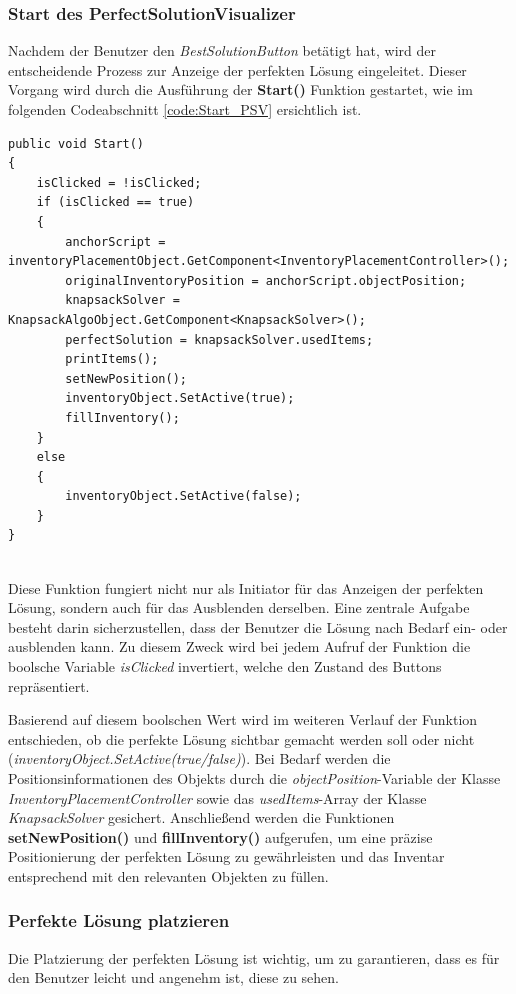 \subsubsection{Start des PerfectSolutionVisualizer}
Nachdem der Benutzer den \textit{BestSolutionButton} betätigt hat, wird der entscheidende Prozess zur Anzeige der perfekten
Lösung eingeleitet. Dieser Vorgang wird durch die Ausführung der \textbf{Start()} Funktion gestartet, wie im folgenden
Codeabschnitt \ref{code:Start_PSV} ersichtlich ist.
\begin{lstlisting}[style=csharp, caption={PerfectSolutionVisualizer Start}, label=code:Start_PSV]
public void Start()
{
    isClicked = !isClicked;
    if (isClicked == true)
    {
        anchorScript = inventoryPlacementObject.GetComponent<InventoryPlacementController>();
        originalInventoryPosition = anchorScript.objectPosition;
        knapsackSolver = KnapsackAlgoObject.GetComponent<KnapsackSolver>();
        perfectSolution = knapsackSolver.usedItems;
        printItems();
        setNewPosition();
        inventoryObject.SetActive(true);
        fillInventory();
    }
    else
    {
        inventoryObject.SetActive(false);
    }
}
\end{lstlisting}\\
Diese Funktion fungiert nicht nur als Initiator für das Anzeigen der perfekten Lösung, sondern auch für das Ausblenden
derselben. Eine zentrale Aufgabe besteht darin sicherzustellen, dass der Benutzer die Lösung nach Bedarf ein- oder
ausblenden kann. Zu diesem Zweck wird bei jedem Aufruf der Funktion die boolsche Variable \textit{isClicked} invertiert,
welche den Zustand des Buttons repräsentiert.

Basierend auf diesem boolschen Wert wird im weiteren Verlauf der Funktion entschieden, ob die perfekte Lösung sichtbar
gemacht werden soll oder nicht (\textit{inventoryObject.SetActive(true/false)}). Bei Bedarf werden die Positionsinformationen
des Objekts durch die \textit{objectPosition}-Variable der Klasse \textit{InventoryPlacementController} sowie das
\textit{usedItems}-Array der Klasse \textit{KnapsackSolver} gesichert. Anschließend werden die Funktionen \textbf{setNewPosition()}
und \textbf{fillInventory()} aufgerufen, um eine präzise Positionierung der perfekten Lösung zu gewährleisten und das
Inventar entsprechend mit den relevanten Objekten zu füllen.


\subsubsection{Perfekte Lösung platzieren}
Die Platzierung der perfekten Lösung ist wichtig, um zu garantieren, dass es für den Benutzer leicht und angenehm ist,
diese zu sehen.

